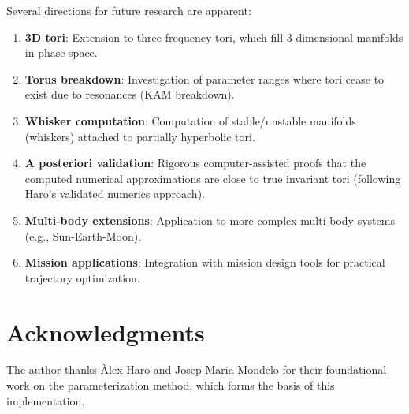 \documentclass[review,onefignum,onetabnum]{siamart220329}
\begin{document}
Several directions for future research are apparent:

\begin{enumerate}
    \item \textbf{3D tori}: Extension to three-frequency tori, which fill
          3-dimensional manifolds in phase space.

    \item \textbf{Torus breakdown}: Investigation of parameter ranges where
          tori cease to exist due to resonances (KAM breakdown).

    \item \textbf{Whisker computation}: Computation of stable/unstable manifolds
          (whiskers) attached to partially hyperbolic tori.

    \item \textbf{A posteriori validation}: Rigorous computer-assisted proofs
          that the computed numerical approximations are close to true invariant
          tori (following Haro's validated numerics approach).

    \item \textbf{Multi-body extensions}: Application to more complex multi-body
          systems (e.g., Sun-Earth-Moon).

    \item \textbf{Mission applications}: Integration with mission design tools
          for practical trajectory optimization.
\end{enumerate}

\section*{Acknowledgments}

The author thanks Àlex Haro and Josep-Maria Mondelo for their foundational work
on the parameterization method, which forms the basis of this implementation.



\end{document}
